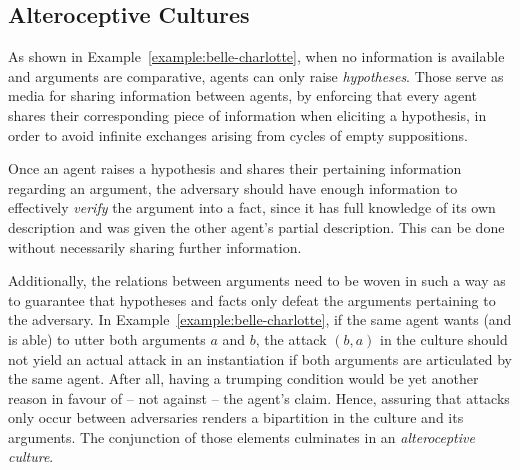 \documentclass[acmsmall]{custom-arxiv}  %
\begin{document}
\subsection{Alteroceptive Cultures}

As shown in Example~\ref{example:belle-charlotte}, when no information is available and arguments are comparative, agents can only raise \textit{hypotheses}. Those serve as media for sharing information between agents, by enforcing that every agent shares their corresponding piece of information when eliciting a hypothesis, in order to avoid infinite exchanges arising from cycles of empty suppositions.

Once an agent raises a hypothesis and shares their pertaining information regarding an argument, the adversary should have enough information to effectively \textit{verify} the argument into a fact, since it has full knowledge of its own description and was given the other agent's partial description. This can be done without necessarily sharing further information.

Additionally, the relations between arguments need to be woven in such a way as to guarantee that hypotheses and facts only defeat the arguments pertaining to the adversary. In Example~\ref{example:belle-charlotte}, if the same agent wants (and is able) to utter both arguments $a$ and $b$, the attack $(b, a)$ in the culture should not yield an actual attack in an instantiation if both arguments are articulated by the same agent.
After all, having a trumping %
condition would be yet another reason in favour of -- not against -- the agent's claim. Hence, assuring that attacks only occur between adversaries renders a bipartition in the culture and its arguments. The conjunction of those elements culminates in an \textit{alteroceptive culture}.
\end{document}
